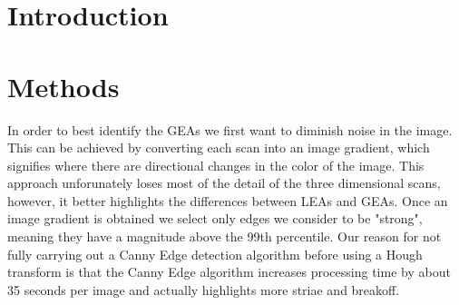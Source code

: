 \documentclass[12pt]{article}
\theoremstyle{nonumberplain}
\begin{document}


\section{Introduction}

\section{Methods}


In order to best identify the GEAs we first want to diminish noise in the image. This can be achieved by converting each scan into an image gradient, which signifies where there are directional changes in the color of the image. This approach unforunately loses most of the detail of the three dimensional scans, however, it better highlights the differences between LEAs and GEAs. Once an image gradient is obtained we select only edges we consider to be "strong", meaning they have a magnitude above the 99th percentile. Our reason for not fully carrying out a Canny Edge detection algorithm before using a Hough transform is that the Canny Edge algorithm increases processing time by about 35 seconds per image and actually highlights more striae and breakoff. 
\end{document}
